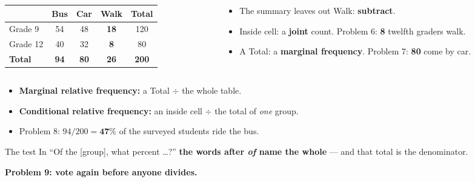 \documentclass[aspectratio=169, 11pt]{beamer}
\newcommand{\redink}[1]{{\color{redacc}\bfseries #1}}
\begin{document}
\begin{frame}[t, plain]
  \begin{columns}[t]
    \begin{column}{0.54\textwidth}
      \renewcommand{\arraystretch}{1.4}
      \begin{tabular}[t]{l c c c c}
      \hline
       & \textbf{Bus} & \textbf{Car} & \textbf{Walk} & \textbf{Total} \\
      \hline
      Grade 9 & 54 & 48 & \redink{18} & 120 \\
      Grade 12 & 40 & 32 & \redink{8} & 80 \\
      \textbf{Total} & \textbf{94} & \textbf{80} & \textbf{26} & \textbf{200} \\
      \hline
      \end{tabular}
    \end{column}
    \begin{column}{0.42\textwidth}
      \begin{itemize}\setlength{\itemsep}{5pt}
        \item The summary leaves out Walk: \textbf{subtract}.
        \item Inside cell: a \textbf{joint} count. Problem 6: \textbf{8} twelfth graders walk.
        \item A Total: a \textbf{marginal frequency}. Problem 7: \textbf{80} come by car.
      \end{itemize}
    \end{column}
  \end{columns}
\end{frame}

\begin{frame}[t, plain]
  \begin{itemize}\setlength{\itemsep}{6pt}
    \item \textbf{Marginal relative frequency:} a Total $\div$ the whole table.
    \item \textbf{Conditional relative frequency:} an inside cell $\div$ the total of
          \emph{one} group.
    \item Problem 8: $94/200 = \mathbf{47\%}$ of the surveyed students ride the bus.
  \end{itemize}
  \begin{block}{The test}
    In ``Of the [group], what percent \ldots?'' \redink{the words after \emph{of} name the whole}
    --- and that total is the denominator.
  \end{block}
  \vspace{6pt}
  \begin{center}
    {\color{cerulean}\bfseries Problem 9: vote again before anyone divides.}
  \end{center}
\end{frame}
\end{document}

